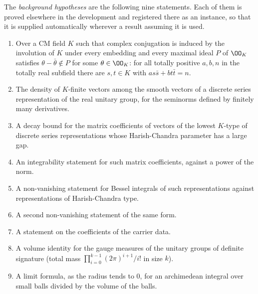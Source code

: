 \begin{hypothesis}\label{pf:thmS-leaves:hyp:background}
The \emph{background hypotheses} are the following nine statements. Each of them is proved elsewhere in the development
\cite{LeanSource2026} and registered there as an instance, so that it is supplied automatically wherever a result
assuming it is used.
\begin{enumerate}
\item Over a CM field $K$ such that complex conjugation is induced by the involution of $K$ under every embedding and
every maximal ideal $P$ of $\OO_K$ satisfies $\theta-\bar\theta\notin P$ for some $\theta\in\OO_K$: for all totally
positive $a,b,n$ in the totally real subfield there are $s,t\in K$ with $as\bar s+bt\bar t=n$.
\item The density of $K$-finite vectors among the smooth vectors of a discrete series representation of the real
unitary group, for the seminorms defined by finitely many derivatives.
\item A decay bound for the matrix coefficients of vectors of the lowest $K$-type of discrete series representations
whose Harish-Chandra parameter has a large gap.
\item An integrability statement for such matrix coefficients, against a power of the norm.
\item A non-vanishing statement for Bessel integrals of such representations against representations of
Harish-Chandra type.
\item A second non-vanishing statement of the same form.
\item A statement on the coefficients of the carrier data.
\item A volume identity for the gauge measures of the unitary groups of definite signature (total mass
$\prod_{i=0}^{k-1}(2\pi)^{i+1}/i!$ in size $k$).
\item A limit formula, as the radius tends to $0$, for an archimedean integral over small balls divided by the volume of
the balls.
\end{enumerate}
\end{hypothesis}

